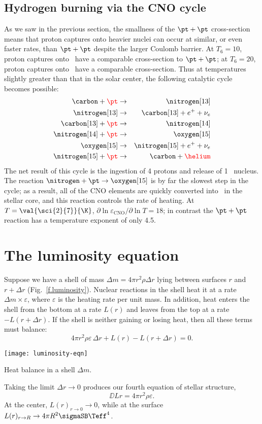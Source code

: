 \subsection{Hydrogen burning via the CNO cycle}

As we saw in the previous section, the smallness of the $\pt+\pt$ cross-section means that proton captures onto heavier nuclei can occur at similar, or even faster rates, than $\pt+\pt$ despite the larger Coulomb barrier. 
At $T_{6} = 10$, proton captures onto \carbon\ have a comparable cross-section to $\pt + \pt$; at $T_{6} = 20$, proton captures onto \oxygen\ have a comparable cross-section.
Thus at temperatures slightly greater than that in the solar center, the following catalytic cycle becomes possible:
\begin{eqnarray*}
\carbon + {\color{red}\pt} &\to& \nitrogen[13]\\
\nitrogen[13] &\to& \carbon[13] + e^{+} + \nu_{e}\\
\carbon[13] + {\color{red}\pt} &\to& \nitrogen[14]\\
\nitrogen[14] + {\color{red}\pt} &\to& \oxygen[15]\\
\oxygen[15] &\to& \nitrogen[15] + e^{+} + \nu_{e}\\
\nitrogen[15] + {\color{red}\pt} &\to& \carbon + {\color{red}\helium}
\end{eqnarray*}
The net result of this cycle is the ingestion of 4 protons and release of 1 \helium\ nucleus.
The reaction $\nitrogen+\pt\to\oxygen[15]$ is by far the slowest step in the cycle; as a result, all of the CNO elements are quickly converted into \nitrogen\ in the stellar core, and this reaction controls the rate of heating. At $T = \val{\sci{2}{7}}{\K}$, $\partial \ln \varepsilon_{\mathrm{CNO}}/\partial\ln T = 18$; in contrast the $\pt+\pt$ reaction has a temperature exponent of only 4.5.


\section{The luminosity equation}

Suppose we have a shell of mass $\Delta m = 4\pi r^{2}\rho\Delta r$ lying between surfaces $r$ and $r+\Delta r$ (Fig.~\ref{f.luminosity}). Nuclear reactions in the shell heat it at a rate $\Delta m \times \varepsilon$, where $\varepsilon$ is the heating rate per unit mass.  In addition, heat enters the shell from the bottom at a rate $L(r)$ and leaves from the top at a rate $-L(r+\Delta r)$. If the shell is neither gaining or losing heat, then all these terms must balance:
\[ 4\pi r^{2}\rho\varepsilon\,\Delta r + L(r) - L(r+\Delta r) = 0. \]
\begin{marginfigure}
\texttt{[image: luminosity-eqn]}
\caption[Heat balance in a mass shell]{Heat balance in a shell $\Delta m$.}
\label{f.luminosity}
\end{marginfigure}
Taking the limit $\Delta r \to 0$ produces our fourth equation of stellar structure,
\[
\DD{L}{r} = 4\pi r^{2}\rho\varepsilon.
\]
At the center, $L(r)_{r\to0}\to0$, while at the surface $L(r)_{r\to R}\to 4\pi R^{2}\sigmaSB\Teff^{4}$.

